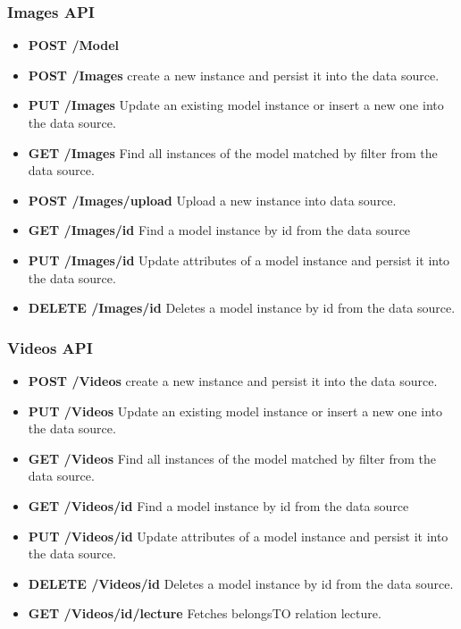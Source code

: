 \subsubsection{ Images API}

\begin{itemize}
\item \textbf{POST /Model}
\item \textbf{POST /Images} create a new instance and persist it into the data source.
\item \textbf{PUT /Images} Update an existing model instance or insert a new one into the data source.
\item \textbf{GET /Images} Find all instances of the model matched by filter from the  data source.
\item \textbf{POST /Images/upload} Upload a new instance into data source.
\item \textbf{GET /Images/id} Find a model instance by id from the data source
\item \textbf{PUT /Images/id} Update attributes of a model instance and persist it into the data source.
\item \textbf{DELETE /Images/id} Deletes a model instance by id from the data 
source.
\end{itemize}

\subsubsection{ Videos API}
\begin{itemize}
\item \textbf{POST /Videos} create a new instance and persist it into the data source.
\item \textbf{PUT /Videos} Update an existing model instance or insert a new one into the data source.
\item \textbf{GET /Videos} Find all instances of the model matched by filter from the  data source.
\item \textbf{GET /Videos/id} Find a model instance by id from the data source
\item \textbf{PUT /Videos/id} Update attributes of a model instance and persist it into the data source.
\item \textbf{DELETE /Videos/id} Deletes a model instance by id from the data 
source. 
\item \textbf{GET /Videos/id/lecture} Fetches belongsTO relation lecture.
\end{itemize}

